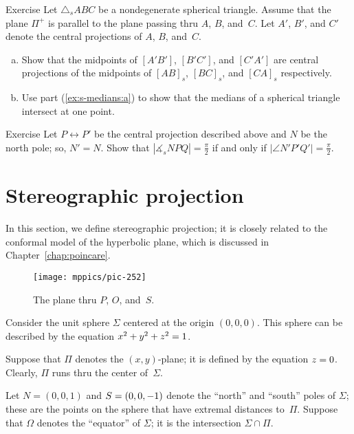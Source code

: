 \begin{thm}{Exercise}\label{ex:s-medians}
Let $\triangle_sABC$ be a nondegenerate spherical triangle.
Assume that the plane $\Pi^+$ is parallel to the plane passing thru $A$, $B$, and~$C$.
Let $A'$, $B'$, and $C'$ denote the central projections of $A$, $B$, and~$C$.
\begin{enumerate}[(a)]
\item\label{ex:s-medians:a} Show that the midpoints of $[A'B']$, $[B'C']$, and $[C'A']$
are central projections of the midpoints of $[AB]_s$, $[BC]_s$, and $[CA]_s$ respectively.
\item\label{ex:s-medians:b} Use part (\ref{ex:s-medians:a}) to show that the medians of a spherical triangle intersect at one point.
\end{enumerate}

\end{thm}


\begin{thm}{Exercise}\label{ex:s-altitudes}
Let $P\leftrightarrow P'$ be the central projection described above
and $N$ be the north pole; so, $N'=N$.
Show that $|\measuredangle_s NPQ|=\tfrac\pi2$ if and only if $|\angle N'P'Q'|=\tfrac\pi2$.
\end{thm}

\section{Stereographic projection}

In this section, we define stereographic projection;
it is closely related to the conformal model of the hyperbolic plane, which is discussed in Chapter~\ref{chap:poincare}.

{

\begin{wrapfigure}{r}{48mm}
\vskip-6mm
\centering
\texttt{[image: mppics/pic-252]}
\caption*{The plane thru $P$, $O$, and~$S$.}
\end{wrapfigure}

Consider the unit sphere $\Sigma$ 
centered at the origin $(0,0,0)$.
This sphere can be described by the equation $x^2+y^2+z^2=1$. 

Suppose that $\Pi$ denotes the $(x,y)$-plane;
it is defined by the equation $z = 0$.
Clearly, $\Pi$
runs thru the center of~$\Sigma$.

Let $N = (0, 0, 1)$ and $S=(0, 0, -1)$ denote the ``north'' and ``south'' poles of $\Sigma$;
these are the points on the sphere that have extremal distances to~$\Pi$.
Suppose that $\Omega$ denotes the ``equator'' of $\Sigma$;
it is the intersection $\Sigma\cap\Pi$.

}

